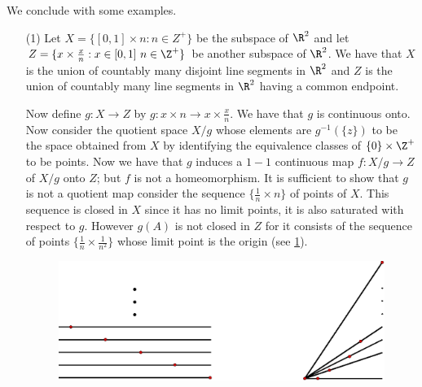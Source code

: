 We conclude with some examples.

\begin{example}
    \begin{enumerate}
        \item[(1)] Let $X=\{[0,1] \times n:n \in Z^+\}$ be the subspace of $\R^2$ and let  $Z=\{x \times
            \frac{x}{n}: x \in [0,1] \text{ } n \in \Z^+\}$ be another subspace of $\R^2$. We have
            that  $X$ is the union of countably many disjoint line segments in  $\R^2$ and  $Z$ is
            the union of countably many line segments in  $\R^2$ having a common endpoint.

            Now define $g:X \rightarrow Z$ by  $g:x \times n \rightarrow x \times \frac{x}{n}$. We
            have that $g$ is continuous onto. Now consider the quotient space  $X/g$ whose elements
            are  $g^{-1}(\{z\})$ to be the space obtained from $X$ by identifying the equivalence
            classes of $\{0\} \times \Z^+$ to be points. Now we have that $g$ induces a  $1-1$
            continuous map  $f:X/g \rightarrow Z$ of  $X/g$ onto  $Z$; but  $f$ is not a
            homeomorphism. It is sufficient to show that  $g$ is not a quotient map consider the
            sequence  $\{\frac{1}{n} \times n\}$ of points of $X$. This sequence is closed in  $X$
            since it has no limit points, it is also saturated with respect to  $g$. However  $g(A)$
            is not closed in $Z$ for it consists of the sequence of points  $\{\frac{1}{n} \times
            \frac{1}{n^2}\}$ whose limit point is the origin (see \ref{fig_2.6}).

            \begin{figure}[h]
                \centering
                \includegraphics[scale = 0.5]{Figures/Chapter2/example_2_8(2).eps}
                \caption{}
                \label{fig_2.6}
            \end{figure}


\end{enumerate}
\end{example}
